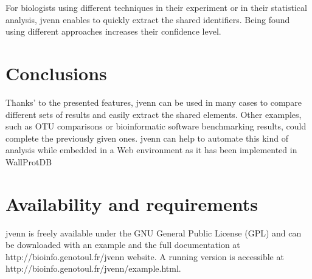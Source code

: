 \documentclass{bmcart}
\begin{document}
For biologists using different techniques in their experiment or in their statistical
analysis, jvenn enables to quickly extract the shared identifiers. Being found 
using different approaches increases their confidence level.

\section*{Conclusions}

Thanks' to the presented features, jvenn can be used in many cases to compare different 
sets of results and easily extract the shared elements. Other examples, such as OTU 
comparisons or bioinformatic software benchmarking results, 
could complete the previously given ones.
jvenn can help to automate this kind of analysis while embedded in a Web environment as it has 
been implemented in WallProtDB \cite{SanClemente}

\section*{Availability and requirements}

jvenn is freely available under the GNU General Public License (GPL) and can be
downloaded with an example and the full documentation at
http://bioinfo.genotoul.fr/jvenn  website. A running version is accessible at
http://bioinfo.genotoul.fr/jvenn/example.html.

\end{document}

